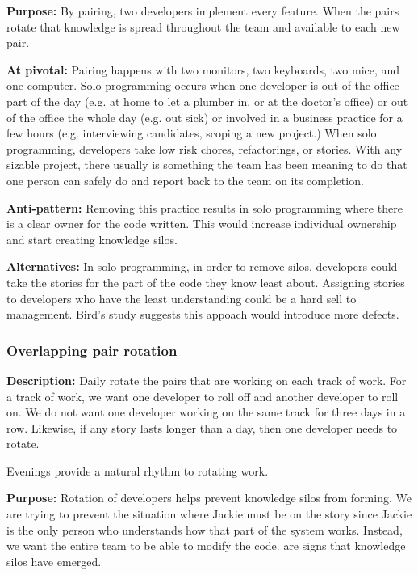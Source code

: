 \begin{table}[]
\textbf{Purpose:} By pairing, two developers implement every feature. When the pairs rotate that knowledge is spread throughout the team and available to each new pair. 

\textbf{At pivotal:} Pairing happens with two monitors, two keyboards, two mice, and one computer. Solo programming occurs when one developer is out of the office part of the day (e.g. at home to let a plumber in, or at the doctor's office) or out of the office the whole day (e.g. out sick) or involved in a business practice for a few hours (e.g. interviewing candidates, scoping a new project.) When solo programming, developers take low risk chores, refactorings, or stories. With any sizable project, there usually is something the team has been meaning to do that one person can safely do and report back to the team on its completion.  

\textbf{Anti-pattern:} Removing this practice results in solo programming where there is a clear owner for the code written. This would increase individual ownership and start creating knowledge silos. 

\textbf{Alternatives:}  In solo programming, in order to remove silos, developers could take the stories for the part of the code they know least about. Assigning stories to developers who have the least understanding could be a hard sell to management. Bird's study \cite{BirdDontTouchMyCode} suggests this appoach would introduce more defects. 

\subsubsection{Overlapping pair rotation}
\textbf{Description:} Daily rotate the pairs that are working on each track of work. For a track of work, we want one developer to roll off and another developer to roll on.  We do not want one developer working on the same track for three days in a row. Likewise, if any story lasts longer than a day, then one developer needs to rotate.

Evenings provide a natural rhythm to rotating work. 

\textbf{Purpose:} Rotation of developers helps prevent knowledge silos from forming. We are trying to prevent the situation where Jackie must be on the story since Jackie is the only person who understands how that part of the system works. Instead, we want the entire team to be able to modify the code.  are signs that knowledge silos have emerged. 



\end{table}
